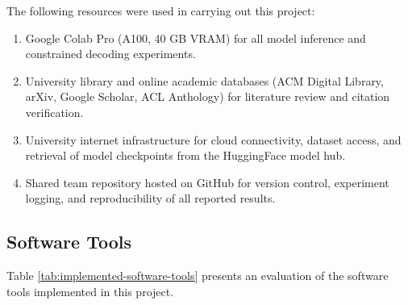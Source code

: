 The following resources were used in carrying out this project:

\begin{enumerate}[label=\roman*.]
  \item Google Colab Pro (A100, 40 GB VRAM) for all model inference and constrained decoding experiments.
  \item University library and online academic databases (ACM Digital Library, arXiv, Google Scholar, ACL Anthology) for literature review and citation verification.
  \item University internet infrastructure for cloud connectivity, dataset access, and retrieval of model checkpoints from the HuggingFace model hub.
  \item Shared team repository hosted on GitHub for version control, experiment logging, and reproducibility of all reported results.
\end{enumerate}


\subsection{Software Tools}

Table \ref{tab:implemented-software-tools} presents an evaluation of the software tools implemented in this project.

